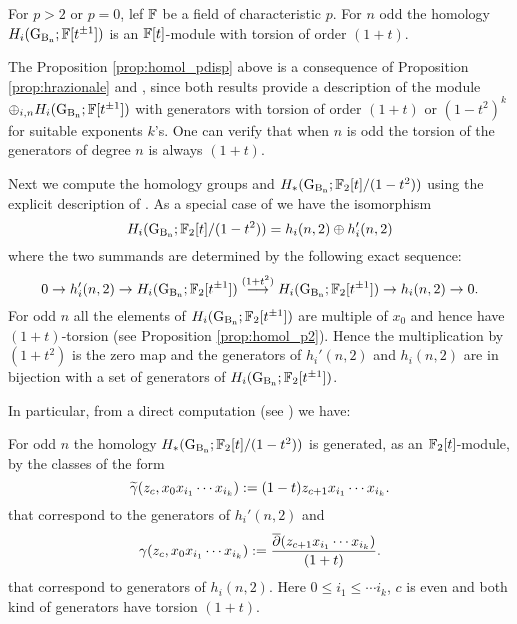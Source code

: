 \begin{prop}\label{prop:homol_pdisp}
For $p >2$ or $p=0$, lef $\mathbb{F}$ be a field of characteristic $p$. For $n$ odd the homology $H_i(\operatorname{G_{B_{n}}}; \mathbb{F}[t^{\pm 1}])$ is an $\mathbb{F}[t]$-module with torsion of order $(1+t)$.
\end{prop}
The Proposition \ref{prop:homol_pdisp} above is a consequence of Proposition \ref{prop:hrazionale} and \cite[Thm.~4.12]{calmar}, since 
both results provide a description of the module $\oplus_{i,n} H_i(\operatorname{G_{B_{n}}}; \mathbb{F}[t^{\pm 1}])$ with generators with torsion of order $(1+t)$ or $(1-t^2)^k$ for suitable exponents $k$'s. One can verify that when $n$ is odd the torsion of the generators of degree $n$ is always $(1+t)$.

Next we compute the homology groups  and $H_*(\operatorname{G_{B_{n}}}; \mathbb{F}_2[t]/(1-t^2))$ 
using the explicit description of \cite[Sec.~4.3 and 4.4]{calmar}.
As a special case of \cite[Prop.~4.7]{calmar} we have 
the isomorphism
\begin{equation}\label{eq:decomposizione}
H_i(\operatorname{G_{B_{n}}}; \mathbb{F}_2[t]/(1-t^2)) = h_{i}(n,2) \oplus h_{i}'(n,2)
\end{equation}
where the two summands are determined by the following exact sequence:
$$
0 \to h_{i}'(n,2) \to H_i(\operatorname{G_{B_{n}}}; \mathbb{F}_2[t^{{\pm 1}}]) \stackrel{(1+t^2)}{\longrightarrow} H_i(\operatorname{G_{B_{n}}}; \mathbb{F}_2[t^{{\pm 1}}]) \to h_{i}(n,2) \to 0.
$$
For odd $n$ all the elements of $H_i(\operatorname{G_{B_{n}}}; \mathbb{F}_2[t^{{\pm 1}}])$ are multiple of $x_0$ and hence have $(1+t)$-torsion (see Proposition \ref{prop:homol_p2}). Hence the multiplication by 
$(1+t^2)$ is the zero map and the generators of  $h_{i}'(n,2)$ and $h_{i}(n,2)$ are  in bijection with a set of generators of $H_i(\operatorname{G_{B_{n}}}; \mathbb{F}_2[t^{{\pm 1}}])$.

In particular, from a direct computation (see \cite[\S 4.4]{calmar}) we have:
\begin{prop} \label{prop:generators}
For odd $n$ the homology $H_*(\operatorname{G_{B_{n}}}; \mathbb{F}_2[t]/(1-t^2))$ is generated, as an $\mathbb{F}_2[t]$-module, by the classes of the form 
\begin{equation}\label{generators1}
\widetilde{\gamma} (z_c, x_0 x_{i_1} \cdots x_{i_k}) := (1-t) z_{c+1} x_{i_1} \cdots x_{i_k}.
\end{equation}
that correspond to the generators of $h_{i}'(n,2)$
and
\begin{equation}\label{generators2}
\operatorname{\gamma}(z_c, x_0 x_{i_1} \cdots x_{i_k}):=\frac{\overline{\partial}(z_{c+1}x_{i_1} \cdots x_{i_k})}{(1+t)}.
\end{equation}
that correspond to generators of $h_{i}(n,2)$. Here $0 \leq i_1 \leq \cdots i_k$, $c$ is even and both kind of generators have
torsion $(1+t)$.
\end{prop}

